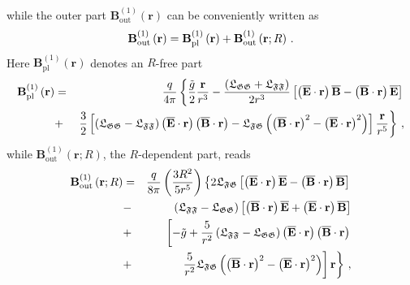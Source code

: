 \documentclass[12pt]{article}
\begin{document}
while the outer part $\mathbf{B}_{\mathrm{out}}^{\left( 1\right) }\left( 
\mathbf{r}\right) $ can be conveniently written as%
\begin{equation}
\mathbf{B}_{\mathrm{out}}^{\left( 1\right) }\left( \mathbf{r}\right) =%
\mathbf{B}_{\mathrm{pl}}^{\left( 1\right) }\left( \mathbf{r}\right) +\mathbf{%
B}_{\mathrm{out}}^{\left( 1\right) }\left( \mathbf{r};R\right) \,.
\label{arb22}
\end{equation}%
Here $\mathbf{B}_{\mathrm{pl}}^{\left( 1\right) }\left( \mathbf{r}\right) $
denotes an $R$-free part%
\begin{eqnarray}
\mathbf{B}_{\mathrm{pl}}^{\left( 1\right) }\left( \mathbf{r}\right)  &=&%
\frac{q}{4\pi }\left\{ \frac{\tilde{g}}{2}\frac{\mathbf{r}}{r^{3}}-\frac{%
\left( \mathfrak{L}_{\mathfrak{GG}}+\mathfrak{L}_{\mathfrak{FF}}\right) }{%
2r^{3}}\left[ \left( \overline{\mathbf{E}}\cdot \mathbf{r}\right) \mathbf{%
\overline{B}}-\left( \mathbf{\overline{B}}\cdot \mathbf{r}\right) \overline{%
\mathbf{E}}\right] \right.   \notag \\
&+&\left. \frac{3}{2}\left[ \left( \mathfrak{L}_{\mathfrak{GG}}-\mathfrak{L}%
_{\mathfrak{FF}}\right) \left( \overline{\mathbf{E}}\cdot \mathbf{r}\right)
\left( \mathbf{\overline{B}}\cdot \mathbf{r}\right) -\mathfrak{L}_{\mathfrak{%
FG}}\left( \left( \mathbf{\overline{B}}\cdot \mathbf{r}\right) ^{2}-\left( 
\overline{\mathbf{E}}\cdot \mathbf{r}\right) ^{2}\right) \right] \frac{%
\mathbf{r}}{r^{5}}\right\} \,,  \label{arb220}
\end{eqnarray}%
while $\mathbf{B}_{\mathrm{out}}^{\left( 1\right) }\left( \mathbf{r}%
;R\right) $, the $R$-dependent part, reads%
\begin{eqnarray}
\mathbf{B}_{\mathrm{out}}^{\left( 1\right) }\left( \mathbf{r};R\right)  &=&%
\frac{q}{8\pi }\left( \frac{3R^{2}}{5r^{5}}\right) \left\{ 2\mathfrak{L}_{%
\mathfrak{FG}}\left[ \left( \overline{\mathbf{E}}\cdot \mathbf{r}\right) 
\overline{\mathbf{E}}-\left( \mathbf{\overline{B}}\cdot \mathbf{r}\right) 
\mathbf{\overline{B}}\right] \right.   \notag \\
&-&\left( \mathfrak{L}_{\mathfrak{FF}}-\mathfrak{L}_{\mathfrak{GG}}\right) %
\left[ \left( \mathbf{\overline{B}}\cdot \mathbf{r}\right) \overline{\mathbf{%
E}}+\left( \overline{\mathbf{E}}\cdot \mathbf{r}\right) \mathbf{\overline{B}}%
\right]   \notag \\
&+&\left[ -\tilde{g}+\frac{5}{r^{2}}\left( \mathfrak{L}_{\mathfrak{FF}}-%
\mathfrak{L}_{\mathfrak{GG}}\right) \left( \overline{\mathbf{E}}\cdot 
\mathbf{r}\right) \left( \mathbf{\overline{B}}\cdot \mathbf{r}\right)
\right.   \notag \\
&+&\left. \left. \frac{5}{r^{2}}\mathfrak{L}_{\mathfrak{FG}}\left( \left( 
\mathbf{\overline{B}}\cdot \mathbf{r}\right) ^{2}-\left( \overline{\mathbf{E}%
}\cdot \mathbf{r}\right) ^{2}\right) \right] \mathbf{r}\right\} \,,
\label{arb22R}
\end{eqnarray}%
\end{document}
